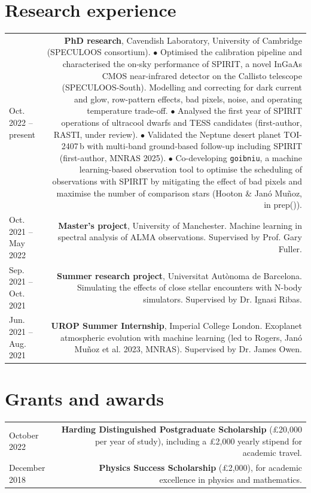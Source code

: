 \documentclass{article}
\begin{document}
\section*{Research experience}
\begin{tabular}{L!{\vrule}R}
    Oct. 2022 -- present & \textbf{PhD research}, Cavendish Laboratory, University of Cambridge (SPECULOOS consortium). \newline
    \hspace*{0.6em}$\bullet$ Optimised the calibration pipeline and characterised the on-sky performance of SPIRIT, a novel InGaAs CMOS near-infrared detector on the Callisto telescope (SPECULOOS-South). Modelling and correcting for dark current and glow, row-pattern effects, bad pixels, noise, and operating temperature trade-off. \newline
    \hspace*{0.6em}$\bullet$ Analysed the first year of SPIRIT operations of ultracool dwarfs and TESS candidates (first-author, RASTI, under review). \newline
    \hspace*{0.6em}$\bullet$ Validated the Neptune desert planet TOI-2407\,b with multi-band ground-based follow-up including SPIRIT (first-author, MNRAS 2025). \newline
    \hspace*{0.6em}$\bullet$ Co-developing \texttt{goibniu}, a machine learning-based observation tool to optimise the scheduling of observations with SPIRIT by mitigating the effect of bad pixels and maximise the number of comparison stars (Hooton \& Janó Muñoz, in prep()). \\
    Oct. 2021 -- May 2022 & \textbf{Master's project}, University of Manchester. Machine learning in spectral analysis of ALMA observations. Supervised by Prof. Gary Fuller.\\
    Sep. 2021 -- Oct. 2021 & \textbf{Summer research project}, Universitat Autònoma de Barcelona. Simulating the effects of close stellar encounters with N-body simulators. Supervised by Dr. Ignasi Ribas. \\
    Jun. 2021 -- Aug. 2021 & \textbf{UROP Summer Internship}, Imperial College London. Exoplanet atmospheric evolution with machine learning (led to Rogers, Janó Muñoz et al. 2023, MNRAS). Supervised by Dr. James Owen.\\
\end{tabular}

\section*{Grants and awards}
\begin{tabular}{L!{\vrule}R}
    October 2022 & \textbf{Harding Distinguished Postgraduate Scholarship} (£20,000 per year of study), including a £2,000 yearly stipend for academic travel. \\
    December 2018 & \textbf{Physics Success Scholarship} (£2,000), for academic excellence in physics and mathematics.\\
\end{tabular}
\end{document}
